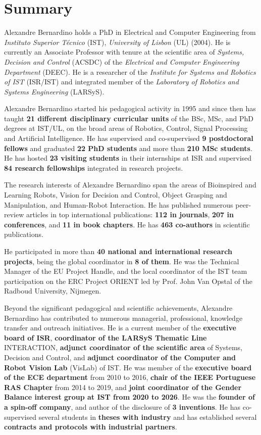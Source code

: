 \section*{Summary}\label{summary}

Alexandre Bernardino holds a PhD in Electrical and Computer Engineering
from \emph{Instituto Superior Técnico} (IST), \emph{University of
Lisbon} (UL) (2004). He is currently an Associate Professor with tenure
at the scientific area of \emph{Systems, Decision and Control} (ACSDC)
of the \emph{Electrical and Computer Engineering Department} (DEEC). He
is a researcher of the \emph{Institute for Systems and Robotics of IST}
(ISR/IST) and integrated member of the \emph{Laboratory of Robotics and
Systems Engineering} (LARSyS).

Alexandre Bernardino started his pedagogical activity in 1995 and since
then has taught \textbf{21 different disciplinary curricular units} of
the BSc, MSc, and PhD degrees at IST/UL, on the broad areas of Robotics,
Control, Signal Processing and Artificial Intelligence. He has
supervised and co-supervised \textbf{9 postdoctoral fellows} and
graduated \textbf{22 PhD students} and more than \textbf{210 MSc
students}. He has hosted \textbf{23 visiting students} in their
internships at ISR and supervised \textbf{84 research fellowships}
integrated in research projects.

The research interests of Alexandre Bernardino span the areas of
Bioinspired and Learning Robots, Vision for Decision and Control, Object
Grasping and Manipulation, and Human-Robot Interaction. He has published
numerous peer-review articles in top international publications:
\textbf{112 in journals}, \textbf{207 in conferences}, and \textbf{11 in
book chapters}. He has \textbf{463 co-authors} in scientific
publications.

He participated in more than \textbf{40 national and international
research projects}, being the global coordinator in \textbf{8 of them}.
He was the Technical Manager of the EU Project Handle, and the local
coordinator of the IST team participation on the ERC Project ORIENT led
by Prof. John Van Opstal of the Radboud University, Nijmegen.

Beyond the significant pedagogical and scientific achievements,
Alexandre Bernardino has contributed to numerous managerial,
professional, knowledge transfer and outreach initiatives. He is a
current member of the \textbf{executive board of ISR},
\textbf{coordinator of the LARSyS Thematic Line} INTERACTION,
\textbf{adjunct coordinator of the scientific area} of Systems, Decision
and Control, and \textbf{adjunct coordinator of the Computer and Robot
Vision Lab} (VisLab) of IST. He was member of the \textbf{executive
board of the ECE department} from 2010 to 2016, \textbf{chair of the
IEEE Portuguese RAS Chapter} from 2014 to 2019, and \textbf{joint
coordinator of the Gender Balance interest group at IST from 2020 to
2026}. He was the \textbf{founder of a spin-off company}, and author of
the disclosure of \textbf{3 inventions}. He has co-supervised several
students in \textbf{theses with industry} and has established several
\textbf{contracts and protocols with industrial partners}.
